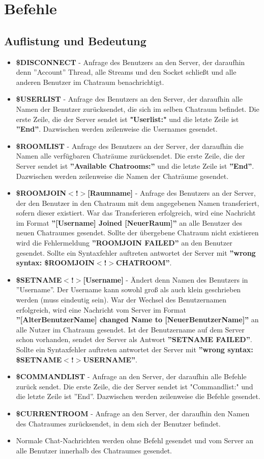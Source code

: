 \documentclass[a4paper, oneside]{scrreprt}
\begin{document}
\chapter{Befehle}

\section{Auflistung und Bedeutung}

\begin{itemize}
\item \textbf{\$DISCONNECT} - Anfrage des Benutzers an den Server, der daraufhin denn ''Account'' Thread, alle Streams und den Socket schließt und alle anderen Benutzer im Chatraum benachrichtigt.
\item \textbf{\$USERLIST} - Anfrage des Benutzers an den Server, der daraufhin alle Namen der Benutzer zurücksendet, die sich im selben Chatraum befindet. Die erste Zeile, die der Server sendet ist \textbf{"Userlist:"} und die letzte Zeile ist \textbf{''End''}. Dazwischen werden zeilenweise die Usernames gesendet. 
\item \textbf{\$ROOMLIST} - Anfrage des Benutzers an der Server, der daraufhin die Namen alle verfügbaren Chaträume zurücksendet. Die erste Zeile, die der Server sendet ist \textbf{''Available Chatrooms:''} und die letzte Zeile ist \textbf{''End''}. Dazwischen werden zeilenweise die Namen der Chaträume gesendet.
\item \textbf{\$ROOMJOIN$<$!$>$[Raumname]} - Anfrage des Benutzers an der Server, der den Benutzer in den Chatraum mit dem angegebenen Namen transferiert, sofern dieser existiert. War das Transferieren erfolgreich, wird eine Nachricht im Format \textbf{''[Username] Joined [NeuerRaum]''} an alle Benutzer des neuen Chatraumes gesendet. Sollte der übergebene Chatraum nicht existieren wird die Fehlermeldung \textbf{''ROOMJOIN FAILED''} an den Benutzer gesendet. Sollte ein Syntaxfehler auftreten antwortet der Server mit \textbf{''wrong syntax: \$ROOMJOIN$<$!$>$CHATROOM''}.
\item \textbf{\$SETNAME$<$!$>$[Username]} - Ändert denn Namen des Benutzers in ''Username''. Der Username kann
sowohl groß als auch klein geschrieben werden (muss eindeutig sein). War der Wechsel des Benutzernamen erfolgreich, wird eine Nachricht vom Server im Format \textbf{''[AlterBenutzerName] changed Name to [NeuerBenutzerName]''} an alle Nutzer im Chatraum gesendet. Ist der Benutzername auf dem Server schon vorhanden, sendet der Server als Antwort \textbf{''SETNAME FAILED''}. Sollte ein Syntaxfehler auftreten antwortet der Server mit \textbf{''wrong syntax: \$SETNAME$<$!$>$USERNAME''}.
\item \textbf{\$COMMANDLIST} - Anfrage an den Server, der daraufhin alle Befehle zurück sendet. Die erste Zeile, die der Server sendet ist "Commandlist:" und die letzte Zeile ist ''End''. Dazwischen werden zeilenweise die Befehle gesendet.
\item \textbf{\$CURRENTROOM} - Anfrage an den Server, der daraufhin den Namen des Chatraumes zurücksendet, in dem sich der Benutzer befindet. 
\item Normale Chat-Nachrichten werden ohne Befehl gesendet und vom Server an alle Benutzer innerhalb des Chatraumes gesendet.
\end{itemize}
\end{document}
